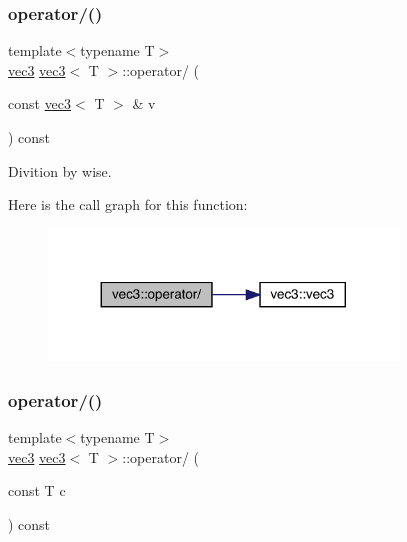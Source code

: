 \mbox{\label{structvec3_ad2f8afc304554e7b5d7331030e8bc91d}} 
\subsubsection{\texorpdfstring{operator/()}{operator/()}\hspace{0.1cm}{\footnotesize\ttfamily [1/2]}}
{\footnotesize\ttfamily template$<$typename T$>$ \\
\mbox{\hyperlink{structvec3}{vec3}} \mbox{\hyperlink{structvec3}{vec3}}$<$ T $>$\+::operator/ (\begin{DoxyParamCaption}\item[{const \mbox{\hyperlink{structvec3}{vec3}}$<$ T $>$ \&}]{v }\end{DoxyParamCaption}) const\hspace{0.3cm}{\ttfamily [inline]}}



Divition by wise. 

Here is the call graph for this function\+:\nopagebreak
\begin{figure}[H]
\begin{center}
\leavevmode
\includegraphics[width=263pt]{structvec3_ad2f8afc304554e7b5d7331030e8bc91d_cgraph}
\end{center}
\end{figure}
\mbox{\label{structvec3_a1a47d6847627b552a0c642b356985297}} 
\subsubsection{\texorpdfstring{operator/()}{operator/()}\hspace{0.1cm}{\footnotesize\ttfamily [2/2]}}
{\footnotesize\ttfamily template$<$typename T$>$ \\
\mbox{\hyperlink{structvec3}{vec3}} \mbox{\hyperlink{structvec3}{vec3}}$<$ T $>$\+::operator/ (\begin{DoxyParamCaption}\item[{const T}]{c }\end{DoxyParamCaption}) const\hspace{0.3cm}{\ttfamily [inline]}}



